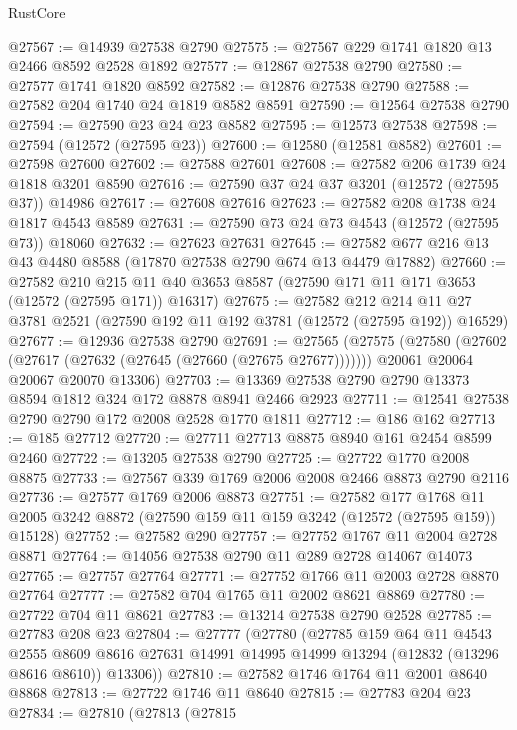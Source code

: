 \begin{lexlean}{RustCore}
\begin{coremodule}
@27567 := @14939 @27538 @2790
@27575 := @27567 @229 @1741 @1820 @13 @2466 @8592 @2528 @1892
@27577 := @12867 @27538 @2790
@27580 := @27577 @1741 @1820 @8592
@27582 := @12876 @27538 @2790
@27588 := @27582 @204 @1740 @24 @1819 @8582 @8591
@27590 := @12564 @27538 @2790
@27594 := @27590 @23 @24 @23 @8582
@27595 := @12573 @27538
@27598 := @27594 (@12572 (@27595 @23))
@27600 := @12580 (@12581 @8582)
@27601 := @27598 @27600
@27602 := @27588 @27601
@27608 := @27582 @206 @1739 @24 @1818 @3201 @8590
@27616 := @27590 @37 @24 @37 @3201 (@12572 (@27595 @37)) @14986
@27617 := @27608 @27616
@27623 := @27582 @208 @1738 @24 @1817 @4543 @8589
@27631 := @27590 @73 @24 @73 @4543 (@12572 (@27595 @73)) @18060
@27632 := @27623 @27631
@27645 := @27582 @677 @216 @13 @43 @4480 @8588 (@17870 @27538 @2790 @674 @13 @4479 @17882)
@27660 := @27582
    @210
    @215
    @11
    @40
    @3653
    @8587
    (@27590 @171 @11 @171 @3653 (@12572 (@27595 @171)) @16317)
@27675 := @27582
    @212
    @214
    @11
    @27
    @3781
    @2521
    (@27590 @192 @11 @192 @3781 (@12572 (@27595 @192)) @16529)
@27677 := @12936 @27538 @2790
@27691 := @27565
    (@27575
      (@27580 (@27602 (@27617 (@27632 (@27645 (@27660 (@27675 @27677)))))))
      @20061
      @20064
      @20067
      @20070
      @13306)
@27703 := @13369 @27538 @2790 @2790 @13373 @8594 @1812 @324 @172 @8878 @8941 @2466 @2923
@27711 := @12541 @27538 @2790 @2790 @172 @2008 @2528 @1770 @1811
@27712 := @186 @162
@27713 := @185 @27712
@27720 := @27711 @27713 @8875 @8940 @161 @2454 @8599 @2460
@27722 := @13205 @27538 @2790
@27725 := @27722 @1770 @2008 @8875
@27733 := @27567 @339 @1769 @2006 @2008 @2466 @8873 @2790 @2116
@27736 := @27577 @1769 @2006 @8873
@27751 := @27582
    @177
    @1768
    @11
    @2005
    @3242
    @8872
    (@27590 @159 @11 @159 @3242 (@12572 (@27595 @159)) @15128)
@27752 := @27582 @290
@27757 := @27752 @1767 @11 @2004 @2728 @8871
@27764 := @14056 @27538 @2790 @11 @289 @2728 @14067 @14073
@27765 := @27757 @27764
@27771 := @27752 @1766 @11 @2003 @2728 @8870 @27764
@27777 := @27582 @704 @1765 @11 @2002 @8621 @8869
@27780 := @27722 @704 @11 @8621
@27783 := @13214 @27538 @2790 @2528
@27785 := @27783 @208 @23
@27804 := @27777
    (@27780
      (@27785
        @159
        @64
        @11
        @4543
        @2555
        @8609
        @8616
        @27631
        @14991
        @14995
        @14999
        @13294
        (@12832 (@13296 @8616 @8610))
        @13306))
@27810 := @27582 @1746 @1764 @11 @2001 @8640 @8868
@27813 := @27722 @1746 @11 @8640
@27815 := @27783 @204 @23
@27834 := @27810
    (@27813
      (@27815

\end{coremodule}
\end{lexlean}
